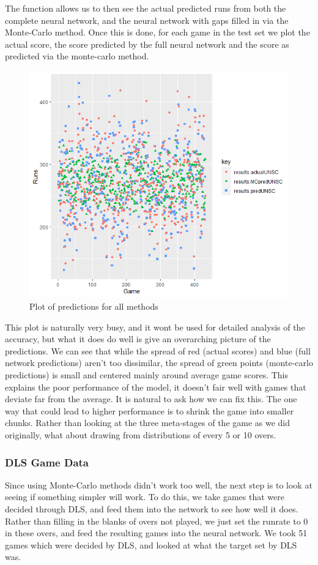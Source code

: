 The function allows us to then see the actual predicted runs from both the complete neural network, and the neural network with 
gaps filled in via the Monte-Carlo method. Once this is done, for each game in the test set we plot the actual score, the score predicted by the full neural network and 
the score as predicted via the monte-carlo method. 

\begin{figure}[h]
    \label{fullPredDist}
    \centering
    \caption{Plot of predictions for all methods}
    \includegraphics[scale=0.6]{figures/fullPredDist.png}
\end{figure}

This plot is naturally very busy, and it wont be used for detailed analysis of the accuracy, but what it does do well is give an overarching picture of the predictions. 
We can see that while the spread of red (actual scores) and blue (full network predictions) aren't too dissimilar, the spread of green points (monte-carlo predictions) is small and centered mainly 
around average game scores. This explains the poor performance of the model, it doesn't fair well with games that deviate far from the average. It is natural to ask how we can fix this. The one way that 
could lead to higher performance is to shrink the game into smaller chunks. Rather than looking at the three meta-stages of the game as we did originally, what about drawing from distributions of every 5 or 10 overs.

\subsubsection{DLS Game Data}
Since using Monte-Carlo methods didn't work too well, the next step is to look at seeing if something simpler will work. To do this, we take games that were decided through DLS, and 
feed them into the network to see how well it does. Rather than filling in the blanks of overs not played, we just set the runrate to 0 in these overs, and feed the resulting games into the neural network. 
We took 51 games which were decided by DLS, and looked at what the target set by DLS was. 

